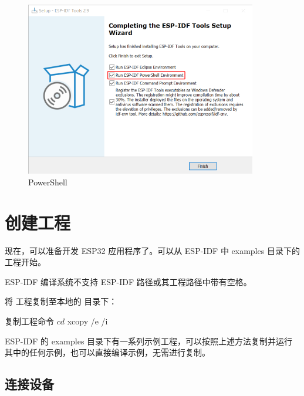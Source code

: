 \documentclass[lang=cn,newtx,10pt,scheme=chinese]{elegantbook}
\begin{document}
\begin{figure}[!htb]
\centering
\includegraphics[width=0.9\textwidth]{esp-idf-installer-screenshot-powershell.png}
\caption{PowerShell}
\end{figure}

\chapter{创建工程}

现在，可以准备开发 ESP32 应用程序了。可以从 ESP-IDF 中 examples 目录下的  工程开始。

\begin{marker}
    ESP-IDF 编译系统不支持 ESP-IDF 路径或其工程路径中带有空格。
\end{marker}

将  工程复制至本地的  目录下：

\begin{mycode}{复制工程命令}
$ cd %
$ xcopy /e /i %
\end{mycode}


\begin{marker}
    ESP-IDF 的 examples 目录下有一系列示例工程，可以按照上述方法复制并运行其中的任何示例，也可以直接编译示例，无需进行复制。
\end{marker}

\section{连接设备}
\end{document}
